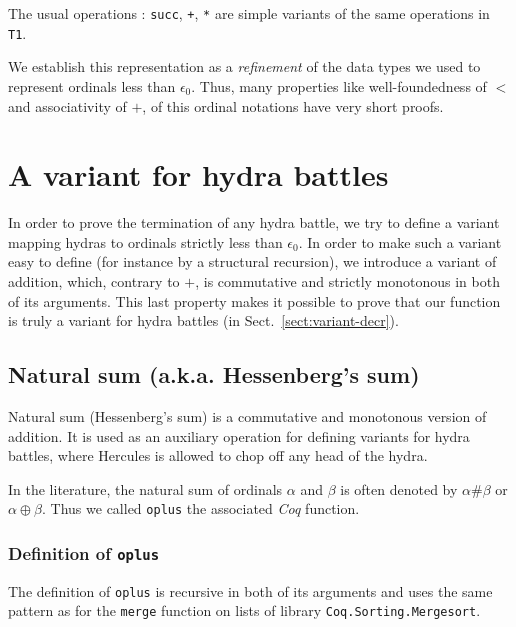   The usual operations : \texttt{succ}, \texttt{+}, \texttt{*} are simple variants of the same operations in \texttt{T1}.

    We establish this representation as a \emph{refinement} of the data types we used to represent ordinals less than $\epsilon_0$. Thus, many properties like well-foundedness of $<$ and associativity of $+$,  of this ordinal notations have very short proofs.
    
    \section{A variant for hydra battles}

    In order to prove the termination of any hydra battle, we try to define a variant mapping hydras to ordinals strictly less than $\epsilon_0$.
    In order to make such a variant easy to define (for instance by a structural recursion), we introduce a variant of addition, which, contrary to
    $+$, is commutative and strictly monotonous in both of its arguments. This last property makes it possible to prove that our function is 
    truly a variant for hydra battles (in Sect.~\vref{sect:variant-decr}).

    \subsection{Natural sum (a.k.a. Hessenberg's  sum)}
    \label{sec:orgheadline87}
    \label{hydra-variant}

    Natural sum (Hessenberg's  sum) is a commutative and monotonous version of
    addition. It is used as an auxiliary operation  for defining variants
    for hydra battles, where Hercules is allowed to chop off any  head of the hydra.

    In the literature, the natural sum of ordinals \(\alpha\) and \(\beta\)
    is often denoted by \(\alpha \# \beta\)  or  \(\alpha \oplus  \beta\).
    Thus we called \texttt{oplus} the associated \emph{Coq} function.

    \subsubsection{Definition of \texttt{oplus}}
    \label{sec:orgheadline84}

    The definition of \texttt{oplus} is recursive in both of its 
    arguments and uses  the same pattern as for the \texttt{merge} function on lists of library
    \texttt{Coq.Sorting.Mergesort}.

